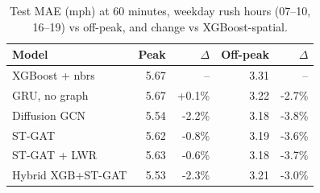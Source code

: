 \begin{table}[t]\centering
\caption{Test MAE (mph) at 60 minutes, weekday rush hours (07--10, 16--19) vs off-peak, and change vs XGBoost-spatial.}
\label{tab:peak}\footnotesize
\begin{tabular}{lrrrr}\hline
Model & Peak & $\Delta$ & Off-peak & $\Delta$\\\hline
XGBoost + nbrs & 5.67 & -- & 3.31 & --\\
GRU, no graph & 5.67 & +0.1\% & 3.22 & -2.7\%\\
Diffusion GCN & 5.54 & -2.2\% & 3.18 & -3.8\%\\
ST-GAT & 5.62 & -0.8\% & 3.19 & -3.6\%\\
ST-GAT + LWR & 5.63 & -0.6\% & 3.18 & -3.7\%\\
Hybrid XGB+ST-GAT & 5.53 & -2.3\% & 3.21 & -3.0\%\\
\hline\end{tabular}\end{table}

